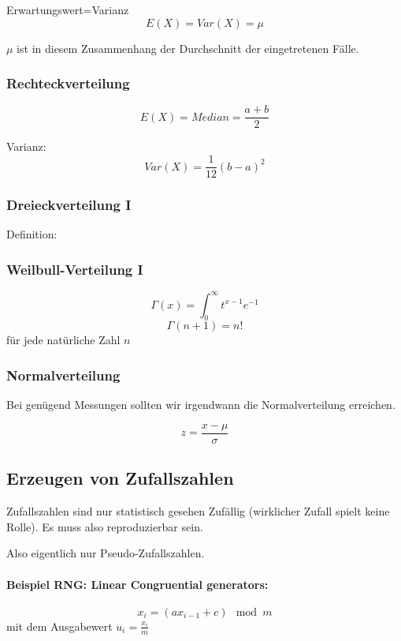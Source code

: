 Erwartungswert=Varianz
\[
	E(X) = Var(X) = \mu
\]

$\mu$ ist in diesem Zusammenhang der Durchschnitt der eingetretenen Fälle.

\subsubsection{Rechteckverteilung}

\[
	E(X) = Median = \frac{a+b}2
\]

Varianz:
\[
	Var(X) = \frac{1}{12}(b-a)^2
\]


\subsubsection{Dreieckverteilung I}

Definition:


\subsubsection{Weilbull-Verteilung I}



\[
	\Gamma(x) = \int^\infty_0 t^{x-1} e^{-1}
\]
\[
\Gamma(n+1) = n!
\]
für jede natürliche Zahl $n$

\subsubsection{Normalverteilung}

Bei genügend Messungen sollten wir irgendwann die Normalverteilung erreichen.



\[
	z = \frac{x - \mu}{\sigma}
\]


\subsection{Erzeugen von Zufallszahlen}

Zufallszahlen sind nur statistisch gesehen Zufällig (wirklicher Zufall spielt keine Rolle). Es muss also reproduzierbar sein.

Also eigentlich nur Pseudo-Zufallszahlen.

\paragraph{Beispiel RNG: Linear Congruential generators:}
\[
	x_i = (a x_{i-1} + c) \mod m
\]
mit dem Ausgabewert $u_i = \frac{x_i}{m}$

